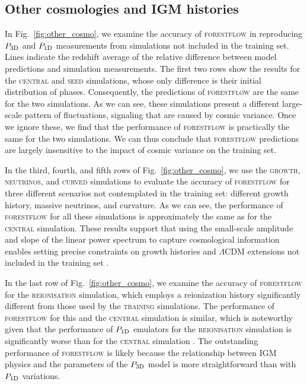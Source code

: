 \documentclass[longauth]{aa}
\newcommand{\poned}{\ensuremath{P_{\rm 1D}}\xspace}
\newcommand{\pthreed}{\ensuremath{P_{\rm 3D}}\xspace}
\newcommand{\forestflow}{\textsc{forestflow}\xspace}
\newcommand{\lacehc}{\textsc{training}\xspace}
\newcommand{\simseed}{\textsc{seed}\xspace}
\newcommand{\simigm}{\textsc{reionisation}\xspace}
\newcommand{\simcurved}{\textsc{curved}\xspace}
\newcommand{\simh}{\textsc{growth}\xspace}
\newcommand{\simnu}{\textsc{neutrinos}\xspace}
\newcommand{\simcentral}{\textsc{central}\xspace}
\begin{document}
\subsection{Other cosmologies and IGM histories}
\label{sec:results_other}

In Fig.~\ref{fig:other_cosmo}, we examine the accuracy of \forestflow in reproducing \pthreed and \poned measurements from simulations not included in the training set. Lines indicate the redshift average of the relative difference between model predictions and simulation measurements. The first two rows show the results for the \simcentral and \simseed simulations, whose only difference is their initial distribution of phases. Consequently, the predictions of \forestflow are the same for the two simulations. As we can see, these simulations present a different large-scale pattern of fluctuations, signaling that are caused by cosmic variance. Once we ignore these, we find that the performance of \forestflow is practically the same for the two simulations. We can thus conclude that \forestflow predictions are largely insensitive to the impact of cosmic variance on the training set.

In the third, fourth, and fifth rows of Fig.~\ref{fig:other_cosmo}, we use the \simh, \simnu, and \simcurved simulations to evaluate the accuracy of \forestflow for three different scenarios not contemplated in the training set: different growth history, massive neutrinos, and curvature. As we can see, the performance of \forestflow for all these simulations is approximately the same as for the \simcentral simulation. These results support that using the small-scale amplitude and slope of the linear power spectrum to capture cosmological information enables setting precise constraints on growth histories and $\Lambda$CDM extensions not included in the training set \citep[see also][]{Pedersen2021, pedersen2023CompressingCosmologicalInformation, cabayol-garcia2023NeuralNetworkEmulator}.

In the last row of Fig.~\ref{fig:other_cosmo}, we examine the accuracy of \forestflow for the \simigm simulation, which employs a  reionization history significantly different from those used by the \lacehc simulations. The performance of \forestflow for this and the \simcentral simulation is similar, which is noteworthy given that the performance of \poned emulators for the \simigm simulation is significantly worse than for the \simcentral simulation \citep{cabayol-garcia2023NeuralNetworkEmulator}. The outstanding performance of \forestflow is likely because the relationship between IGM physics and the parameters of the \pthreed model is more straightforward than with \poned variations.
\end{document}
